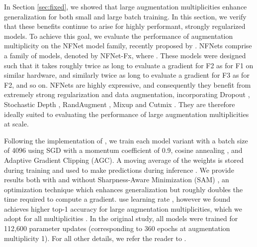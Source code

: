 \documentclass{article}
\begin{document}
In Section \ref{sec:fixed}, we showed that large augmentation multiplicities enhance generalization for both small and large batch training. In this section, we verify that these benefits continue to arise for highly performant, strongly regularized models. To achieve this goal, we evaluate the performance of augmentation multiplicity on the NFNet model family, recently proposed by \citet{brock2021high}. NFNets comprise a family of models, denoted by NFNet-Fx, where . These models were designed such that it takes roughly twice as long to evaluate a gradient for F2 as for F1 on similar hardware, and similarly twice as long to evaluate a gradient for F3 as for F2, and so on. NFNets are highly expressive, and consequently they benefit from extremely strong regularization and data augmentation, incorporating Dropout \citep{srivastava2014dropout}, Stochastic Depth \citep{huang2016deep}, RandAugment \citep{cubuk2020randaugment}, Mixup \citep{zhang2017mixup} and Cutmix \citep{yun2019cutmix}. They are therefore ideally suited to evaluating the performance of large augmentation multiplicities at scale. 





Following the implementation of \citet{brock2021high}, we train each model variant with a batch size of 4096 using SGD with a momentum coefficient of 0.9, cosine annealing \citep{loshchilov2016sgdr}, and Adaptive Gradient Clipping (AGC). A moving average of the weights is stored during training and used to make predictions during inference \citep{szegedy2015going}. We provide results both with and without Sharpness-Aware Minimization (SAM) \citep{foret2020sharpness}, an optimization technique which enhances generalization but roughly doubles the time required to compute a gradient. \citet{brock2021high} use learning rate , however we found  achieves higher top-1 accuracy for large augmentation multiplicities, which we adopt for all multiplicities . In the original study, all models were trained for 112,600 parameter updates (corresponding to 360 epochs at augmentation multiplicity 1). For all other details, we refer the reader to \citet{brock2021high}. 
\end{document}
